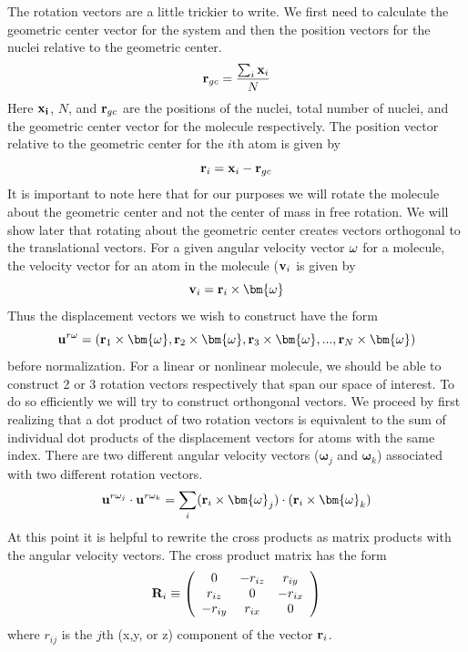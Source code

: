 The rotation vectors are a little trickier to write.  We first need to calculate the geometric center vector for the system and then the position vectors for the nuclei relative to 
the geometric center. 
\begin{equation}
 {\bf{r}}_{gc} = \frac{\sum_i {\bf{x}}_i}{N}
\end{equation}
Here ${\bf{x_i}}$, $N$, and ${\bf{r}}_{gc}$ are the positions of the nuclei, total number of nuclei, and the geometric center vector for the molecule respectively.  
The position vector relative to the geometric center for the $i$th atom is given by
\begin{equation}
\label{eq:geomrel}
 {\bf{r}}_{i}={\bf{x}}_i-{\bf{r}}_{gc}
\end{equation}
It is important to note here that for our purposes we will rotate the molecule about the geometric center and not the center of mass in free rotation.  
We will show later that 
rotating about the geometric center creates vectors orthogonal to the translational vectors. 
For a given angular velocity vector ${\bf{\omega}}$ for a molecule, the velocity vector for an atom in the molecule (${\bf{v}}_i$ is given by 
\begin{equation}
{\bf{v}}_i = {\bf{r}}_{i}\times {\bm{\omega}}
\end{equation}
Thus the displacement vectors we wish to construct have the form
\begin{equation}
\label{eq:rotVec}
 {\bf{u}}^{r\omega}=({\bf{r}}_{1}\times {\bm{\omega}}, {\bf{r}}_{2}\times {\bm{\omega}}, {\bf{r}}_{3}\times {\bm{\omega}}, . . .,{\bf{r}}_{N}\times {\bm{\omega}})
\end{equation}
before normalization.
For a linear or nonlinear molecule, we should be able to construct 2 or 3 rotation vectors respectively that span our space of interest.  
To do so efficiently we will try 
to construct orthongonal vectors. 
We proceed by first realizing that a dot product of two rotation vectors is equivalent to the sum of individual dot products of the displacement vectors
for atoms with the same index.  
There are two different angular velocity vectors (${\bm{\omega}}_j$ and ${\bm{\omega}}_k$) associated with two different rotation vectors.  
\begin{equation}
  {\bf{u}}^{r\omega_j}\cdot {\bf{u}}^{r\omega_k}=\sum_i ({\bf{r}}_{i}\times {\bm{\omega}}_j) \cdot ({\bf{r}}_{i}\times {\bm{\omega}}_k)
\end{equation}
At this point it is helpful to rewrite the cross products as matrix products with the angular velocity vectors. 
The cross product matrix has the form
\begin{equation} 
  {\mathbf R}_i \equiv 
            \left(
              \begin{array}{ccc}
                0  & -r_{iz}   & r_{iy}     \\
                r_{iz}   & 0   & -r_{ix}     \\   
                -r_{iy} & r_{ix} & 0  \\
              \end{array}
            \right)
\end{equation}
where $r_{ij}$ is the $j$th (x,y, or z) component of the vector ${\bf{r}}_{i}$.

